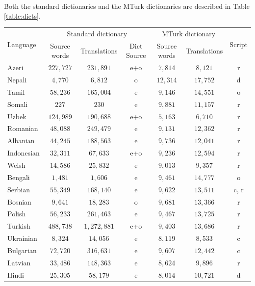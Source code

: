 \documentclass[11pt]{article}
\begin{document}
Both the standard dictionaries and the MTurk dictionaries are described in Table \ref{table:dicts}.

\begin{table}\footnotesize
\begin{center}
\begin{tabular}{|l||c|c|c||c|c||c|}
\hline
\multirow{2}{*}{Language} & \multicolumn{3}{|c||}{Standard dictionary} & \multicolumn{2}{|c||}{MTurk dictionary} & \multirow{2}{*}{Script}\\ \cline{2-6}
& Source words &Translations & Dict Source & Source words & Translations & \\
\hline
Azeri  & $227,727$ & $231,891$ &  e+o & $7,814$ & $8,121$ & r \\
Nepali  & $4,770$ & $6,812$ &  o & $12,314$ & $17,752$ & d \\
Tamil  & $58,236$ & $165,004$ &   e  & $9,146$ & $14,551$ & o \\
Somali  & $227$ & $230$ &   e & $9,881$ & $11,157$ & r \\
Uzbek  & $124,989$ & $190,688$ & e+o & $5,163$ & $6,710$ & r \\
Romanian  & $48,088$ & $249,479$ &  e & $9,131$ & $12,362$ & r \\
Albanian  & $44,245$ & $188,563$ &  e  & $9,736$ & $12,041$ & r\\
Indonesian  & $32,311$ &  $67,633$ & e+o & $9,236$ & $12,594$ & r\\
Welsh  & $14,586$ &  $25,832$ &   e & $9,013$ & $9,357$ & r\\
Bengali  & $1,481$ & $1,606$   & e & $9,461$ & $14,777$ & o \\
Serbian  &  $55,349$ & $168,140$ & e & $9,622$ & $13,511$ & c, r\\
Bosnian    & $9,641$ & $18,283$ & o & $9,681$ & $13,366$ & r\\
Polish  & $56,233$ &  $261,463$ &   e & $9,467$ &  $13,725$ & r\\
Turkish  & $488,738$ &  $1,272,881$  & e+o & $9,403$ &  $13,686$ & r \\
Ukrainian    & $8,324$ & $14,056$ &  e   & $8,119$ & $8,533$ & c\\
Bulgarian  & $72,720$ & $316,631$ &  e  & $9,607$ &  $12,442$ & c \\
Latvian  & $33,486$ & $148,363$ &   e & $8,624$ &  $9,896$ & r \\
Hindi  & $25,305$ & $58,179$ &   e & $8,014$ & $10,721$ & d\\

\end{tabular}
\end{center}
\end{table}
\end{document}
